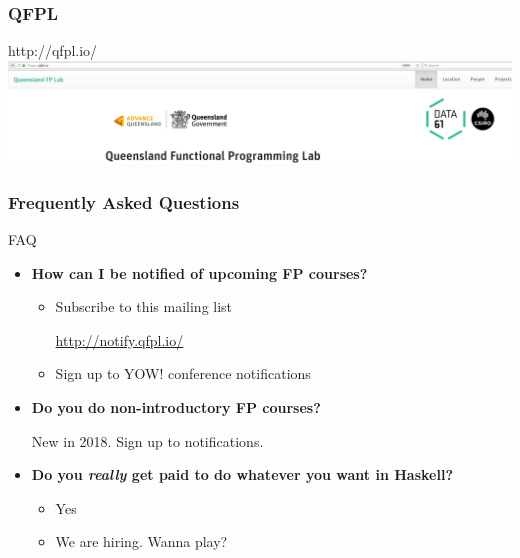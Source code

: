 \begin{frame}
\frametitle{QFPL}
\begin{block}{http://qfpl.io/}
\includegraphics[height=0.24\textheight]{image/qfpl-io.png}
\end{block}
\end{frame}

\begin{frame}
\frametitle{Frequently Asked Questions}
\begin{block}{FAQ}
\begin{itemize}
\item<1-> \textbf{How can I be notified of upcoming FP courses?}
  \begin{itemize}
  \item Subscribe to this mailing list

        \url{http://notify.qfpl.io/}
  \item Sign up to YOW! conference notifications
  \end{itemize}
\item<2-> \textbf{Do you do non-introductory FP courses?}

  New in 2018. Sign up to notifications.
\item<3-> \textbf{Do you \emph{really} get paid to do whatever you want in Haskell?}
  \begin{itemize}
  \item<3-> Yes
  \item<4-> We are hiring. Wanna play?
  \end{itemize}
\end{itemize}
\end{block}
\end{frame}
